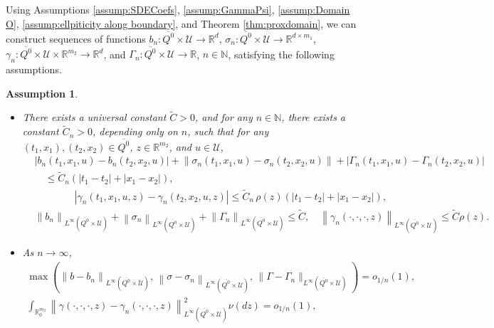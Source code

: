 \documentclass[amscd,amssymb,11pt]{article}
\newtheorem{assumption}[theorem]{Assumption}
\numberwithin{theorem}{section}
\numberwithin{equation}{section}
\begin{document}
Using Assumptions \ref{assump:SDECoefs}, \ref{assump:GammaPsi}, \ref{assump:Domain O}, \ref{assump:ellpiticity along boundary}, and Theorem \ref{thm:proxdomain}, we can construct sequences of functions $b_{n}:\overline{Q^{0}}\times\mathcal{U}\rightarrow\mathbb{R}^{d}$, $\sigma_{n}:\overline{Q^{0}}\times\mathcal{U}\rightarrow\mathbb{R}^{d\times m_{1}}$, $\gamma_{n}:\overline{Q^{0}}\times\mathcal{U}\times\mathbb{R}^{m_{2}}\rightarrow\mathbb{R}^{d}$, and $\Gamma_{n}:\overline{Q^{0}}\times\mathcal{U}\rightarrow\mathbb{R}$, $n\in\mathbb{N}$, satisfying the following assumptions.
\begin{assumption}\label{assump:CondsApproxFunts}
\begin{itemize}
\item [(i)] There exists a universal constant $\widetilde{C}>0$, and for any $n\in\mathbb{N}$, there exists a constant $\widetilde{C}_{n}>0$, depending only on $n$, such that for any $(t_{1},x_{1}),(t_{2},x_{2})\in \overline{Q^{0}}$, $z\in\mathbb{R}^{m_{2}}$, and $u\in\mathcal{U}$,
    \begin{align*}
    &\left|b_{n}(t_{1},x_{1},u)\!-\!b_{n}(t_{2},x_{2},u)\right|+\left\|\sigma_{n}(t_{1},x_{1},u)\!-\!\sigma_{n}(t_{2},x_{2},u)\right\|+\left|\Gamma_{n}(t_{1},x_{1},u)\!-\!\Gamma_{n}(t_{2},x_{2},u)\right|\\
    &\quad\leq\widetilde{C}_{n}\left(\left|t_{1}-t_{2}\right|+\left|x_{1}-x_{2}\right|\right),\\
    &\qquad\qquad\left|\gamma_{n}(t_{1},x_{1},u,z)-\gamma_{n}(t_{2},x_{2},u,z)\right|\leq\widetilde{C}_{n}\,\rho(z)\left(\left|t_{1}-t_{2}\right|+\left|x_{1}-x_{2}\right|\right),\\
    &\left\|b_{n}\right\|_{L^{\infty}(\overline{Q^{0}}\times\mathcal{U})}+\left\|\sigma_{n}\right\|_{L^{\infty}(\overline{Q^{0}}\times\mathcal{U})}+\left\|\Gamma_{n}\right\|_{L^{\infty}(\overline{Q^{0}}\times\mathcal{U})}\leq\widetilde{C},\quad\left\|\gamma_{n}(\cdot,\cdot,\cdot,z)\right\|_{L^{\infty}(\overline{Q^{0}}\times\mathcal{U})}\leq\widetilde{C}\rho(z).
    \end{align*}
\item [(ii)] As $n\rightarrow\infty$,
    \begin{align*}
    \max\left(\left\|b-b_{n}\right\|_{L^{\infty}(\overline{Q^{0}}\times\mathcal{U})},\,\left\|\sigma-\sigma_{n}\right\|_{L^{\infty}(\overline{Q^{0}}\times\mathcal{U})},\,\|\Gamma-\Gamma_{n}\|_{L^{\infty}( \overline{Q^{0}}\times\mathcal{U})}\right)=o_{1/n}(1),\quad\\
    \int_{\mathbb{R}^{m_{2}}_{0}}\left\|\gamma(\cdot,\cdot,\cdot,z)-\gamma_{n}(\cdot,\cdot,\cdot,z)\right\|_{L^\infty(\overline{Q^{0}}\times\mathcal{U})}^{2}\nu(dz)=o_{1/n}(1),\qquad\qquad\quad\\

\end{align*}
\end{itemize}
\end{assumption}
\end{document}
